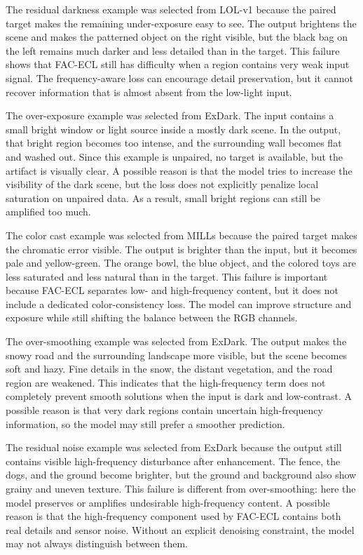 The residual darkness example was selected from LOL-v1 because the paired target makes the remaining under-exposure easy to see. The output brightens the scene and makes the patterned object on the right visible, but the black bag on the left remains much darker and less detailed than in the target. This failure shows that FAC-ECL still has difficulty when a region contains very weak input signal. The frequency-aware loss can encourage detail preservation, but it cannot recover information that is almost absent from the low-light input.

The over-exposure example was selected from ExDark. The input contains a small bright window or light source inside a mostly dark scene. In the output, that bright region becomes too intense, and the surrounding wall becomes flat and washed out. Since this example is unpaired, no target is available, but the artifact is visually clear. A possible reason is that the model tries to increase the visibility of the dark scene, but the loss does not explicitly penalize local saturation on unpaired data. As a result, small bright regions can still be amplified too much.

The color cast example was selected from MILLs because the paired target makes the chromatic error visible. The output is brighter than the input, but it becomes pale and yellow-green. The orange bowl, the blue object, and the colored toys are less saturated and less natural than in the target. This failure is important because FAC-ECL separates low- and high-frequency content, but it does not include a dedicated color-consistency loss. The model can improve structure and exposure while still shifting the balance between the RGB channels.

The over-smoothing example was selected from ExDark. The output makes the snowy road and the surrounding landscape more visible, but the scene becomes soft and hazy. Fine details in the snow, the distant vegetation, and the road region are weakened. This indicates that the high-frequency term does not completely prevent smooth solutions when the input is dark and low-contrast. A possible reason is that very dark regions contain uncertain high-frequency information, so the model may still prefer a smoother prediction.

The residual noise example was selected from ExDark because the output still contains visible high-frequency disturbance after enhancement. The fence, the dogs, and the ground become brighter, but the ground and background also show grainy and uneven texture. This failure is different from over-smoothing: here the model preserves or amplifies undesirable high-frequency content. A possible reason is that the high-frequency component used by FAC-ECL contains both real details and sensor noise. Without an explicit denoising constraint, the model may not always distinguish between them.

